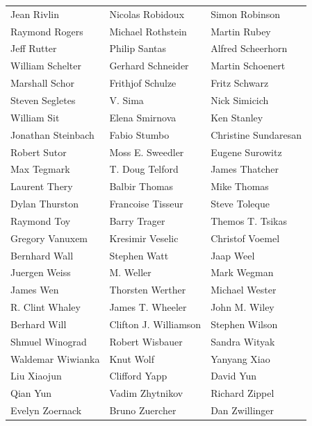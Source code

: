 \begin{tabular}{lll}
Jean Rivlin            & Nicolas Robidoux       & Simon Robinson\\
Raymond Rogers         & Michael Rothstein      & Martin Rubey\\
Jeff Rutter            & Philip Santas          & Alfred Scheerhorn\\
William Schelter       & Gerhard Schneider      & Martin Schoenert\\
Marshall Schor         & Frithjof Schulze       & Fritz Schwarz\\
Steven Segletes        & V. Sima                & Nick Simicich\\
William Sit            & Elena Smirnova         & Ken Stanley\\
Jonathan Steinbach     & Fabio Stumbo           & Christine Sundaresan\\
Robert Sutor           & Moss E. Sweedler       & Eugene Surowitz\\
Max Tegmark            & T. Doug Telford        & James Thatcher\\
Laurent Thery          & Balbir Thomas          & Mike Thomas\\
Dylan Thurston         & Francoise Tisseur      & Steve Toleque\\
Raymond Toy            & Barry Trager           & Themos T. Tsikas\\
Gregory Vanuxem        & Kresimir Veselic       & Christof Voemel\\
Bernhard Wall          & Stephen Watt           & Jaap Weel\\
Juergen Weiss          & M. Weller              & Mark Wegman\\
James Wen              & Thorsten Werther       & Michael Wester\\
R. Clint Whaley        & James T. Wheeler       & John M. Wiley\\
Berhard Will           & Clifton J. Williamson  & Stephen Wilson\\
Shmuel Winograd        & Robert Wisbauer        & Sandra Wityak\\
Waldemar Wiwianka      & Knut Wolf              & Yanyang Xiao\\
Liu Xiaojun            & Clifford Yapp          & David Yun\\
Qian Yun               & Vadim Zhytnikov        & Richard Zippel\\
Evelyn Zoernack        & Bruno Zuercher         & Dan Zwillinger\\
\end{tabular}
\newpage

